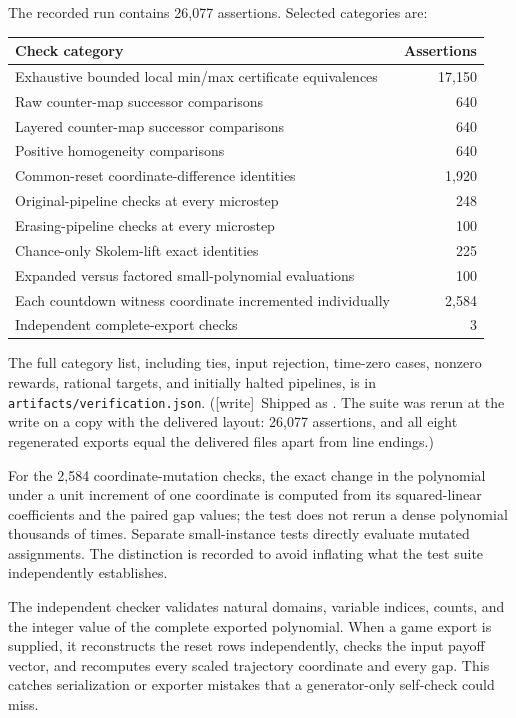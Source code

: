 \documentclass[11pt,letterpaper]{article}
\theoremstyle{definition}
\theoremstyle{remark}
\newcommand{\wtag}{\textup{[write]}}
\begin{document}
The recorded run contains 26,077 assertions. Selected categories are:
\begin{center}
\begin{tabular}{lr}
\toprule
Check category & Assertions\\\midrule
Exhaustive bounded local min/max certificate equivalences & 17,150\\
Raw counter-map successor comparisons & 640\\
Layered counter-map successor comparisons & 640\\
Positive homogeneity comparisons & 640\\
Common-reset coordinate-difference identities & 1,920\\
Original-pipeline checks at every microstep & 248\\
Erasing-pipeline checks at every microstep & 100\\
Chance-only Skolem-lift exact identities & 225\\
Expanded versus factored small-polynomial evaluations & 100\\
Each countdown witness coordinate incremented individually & 2,584\\
Independent complete-export checks & 3\\
\bottomrule
\end{tabular}
\end{center}
The full category list, including ties, input rejection, time-zero cases,
nonzero rewards, rational targets, and initially halted pipelines, is in
\texttt{artifacts/verification.json}. (\wtag\ Shipped as . The suite was rerun at the write on a copy with the delivered layout: 26,077 assertions, and all eight regenerated exports equal the delivered files apart from line endings.)

For the 2,584 coordinate-mutation checks, the exact change in the polynomial
under a unit increment of one coordinate is computed from its squared-linear
coefficients and the paired gap values; the test does not rerun a dense
polynomial thousands of times. Separate small-instance tests directly
evaluate mutated assignments. The distinction is recorded to avoid
inflating what the test suite independently establishes.

The independent checker validates natural domains, variable indices,
counts, and the integer value of the complete exported polynomial.
When a game export is supplied, it reconstructs the reset rows independently,
checks the input payoff vector, and recomputes every scaled trajectory
coordinate and every gap. This catches serialization or exporter mistakes
that a generator-only self-check could miss.
\end{document}
